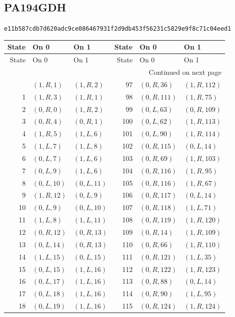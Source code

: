 \subsection{PA194GDH}
\noindent\small\texttt{e11b587cdb7d620adc9ce086467931f2d9db453f56231c5829e9f8c71c04eed1}
\normalsize
\fontsize{9.5}{11}\selectfont
\begin{longtable}{r@{\quad}ll@{\qquad}r@{\quad}ll}
\toprule
State & On 0 & On 1 & State & On 0 & On 1\\
\midrule\endfirsthead
\toprule
State & On 0 & On 1 & State & On 0 & On 1\\
\midrule\endhead
\midrule\multicolumn{6}{r}{Continued on next page}\\\endfoot
\bottomrule\endlastfoot
0 & $(1,R,1)$ & $(1,R,2)$ & 97 & $(0,R,36)$ & $(1,R,112)$\\
1 & $(1,R,3)$ & $(1,R,1)$ & 98 & $(0,R,111)$ & $(1,R,75)$\\
2 & $(0,R,0)$ & $(1,R,2)$ & 99 & $(0,L,63)$ & $(0,R,109)$\\
3 & $(0,R,4)$ & $(0,R,1)$ & 100 & $(0,L,62)$ & $(1,R,113)$\\
4 & $(1,R,5)$ & $(1,L,6)$ & 101 & $(0,L,90)$ & $(1,R,114)$\\
5 & $(1,L,7)$ & $(1,L,8)$ & 102 & $(0,R,115)$ & $(0,L,14)$\\
6 & $(0,L,7)$ & $(1,L,6)$ & 103 & $(0,R,69)$ & $(1,R,103)$\\
7 & $(0,L,9)$ & $(1,L,6)$ & 104 & $(0,R,116)$ & $(1,R,95)$\\
8 & $(0,L,10)$ & $(0,L,11)$ & 105 & $(0,R,116)$ & $(1,R,67)$\\
9 & $(1,R,12)$ & $(0,L,9)$ & 106 & $(0,R,117)$ & $(0,L,14)$\\
10 & $(0,L,9)$ & $(0,L,10)$ & 107 & $(0,R,118)$ & $(1,L,71)$\\
11 & $(1,L,8)$ & $(1,L,11)$ & 108 & $(0,R,119)$ & $(1,R,120)$\\
12 & $(0,R,12)$ & $(0,R,13)$ & 109 & $(0,R,14)$ & $(1,R,109)$\\
13 & $(0,L,14)$ & $(0,R,13)$ & 110 & $(0,R,66)$ & $(1,R,110)$\\
14 & $(1,L,15)$ & $(0,L,15)$ & 111 & $(0,R,121)$ & $(1,L,35)$\\
15 & $(0,L,15)$ & $(1,L,16)$ & 112 & $(0,R,122)$ & $(1,R,123)$\\
16 & $(0,L,17)$ & $(1,L,16)$ & 113 & $(0,R,88)$ & $(0,L,14)$\\
17 & $(0,L,18)$ & $(1,L,16)$ & 114 & $(0,R,90)$ & $(1,L,95)$\\
18 & $(0,L,19)$ & $(1,L,16)$ & 115 & $(0,R,124)$ & $(1,R,124)$\\

\end{longtable}
